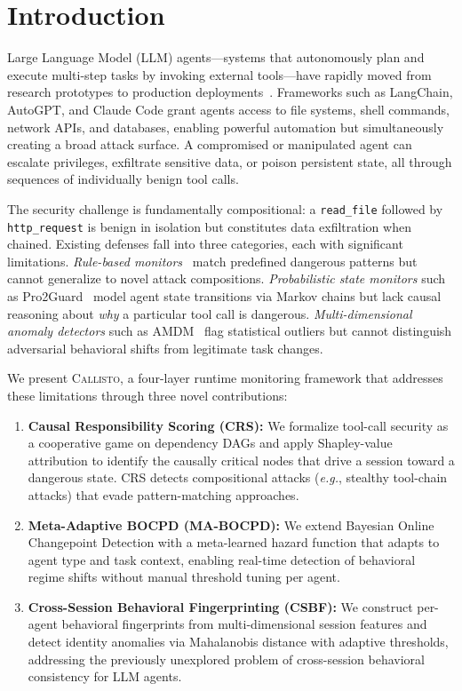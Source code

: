 \documentclass[conference,compsoc]{IEEEtran}
\newcommand{\system}{\textsc{Callisto}}
\newcommand{\eg}{\textit{e.g.}}
\begin{document}
\section{Introduction}
\label{sec:intro}

Large Language Model (LLM) agents---systems that autonomously plan and execute multi-step tasks by invoking external tools---have rapidly moved from research prototypes to production deployments~\cite{schick2024toolformer,qin2024toolllm}. Frameworks such as LangChain, AutoGPT, and Claude Code grant agents access to file systems, shell commands, network APIs, and databases, enabling powerful automation but simultaneously creating a broad attack surface. A compromised or manipulated agent can escalate privileges, exfiltrate sensitive data, or poison persistent state, all through sequences of individually benign tool calls.

The security challenge is fundamentally compositional: a \texttt{read\_file} followed by \texttt{http\_request} is benign in isolation but constitutes data exfiltration when chained. Existing defenses fall into three categories, each with significant limitations. \emph{Rule-based monitors}~\cite{stac2025} match predefined dangerous patterns but cannot generalize to novel attack compositions. \emph{Probabilistic state monitors} such as Pro2Guard~\cite{pro2guard2025} model agent state transitions via Markov chains but lack causal reasoning about \emph{why} a particular tool call is dangerous. \emph{Multi-dimensional anomaly detectors} such as AMDM~\cite{amdm2025} flag statistical outliers but cannot distinguish adversarial behavioral shifts from legitimate task changes.

We present \system{}, a four-layer runtime monitoring framework that addresses these limitations through three novel contributions:

\begin{enumerate}[leftmargin=*,nosep]
\item \textbf{Causal Responsibility Scoring (CRS):} We formalize tool-call security as a cooperative game on dependency DAGs and apply Shapley-value attribution to identify the causally critical nodes that drive a session toward a dangerous state. CRS detects compositional attacks (\eg, stealthy tool-chain attacks) that evade pattern-matching approaches.

\item \textbf{Meta-Adaptive BOCPD (MA-BOCPD):} We extend Bayesian Online Changepoint Detection with a meta-learned hazard function that adapts to agent type and task context, enabling real-time detection of behavioral regime shifts without manual threshold tuning per agent.

\item \textbf{Cross-Session Behavioral Fingerprinting (CSBF):} We construct per-agent behavioral fingerprints from multi-dimensional session features and detect identity anomalies via Mahalanobis distance with adaptive thresholds, addressing the previously unexplored problem of cross-session behavioral consistency for LLM agents.
\end{enumerate}
\end{document}
